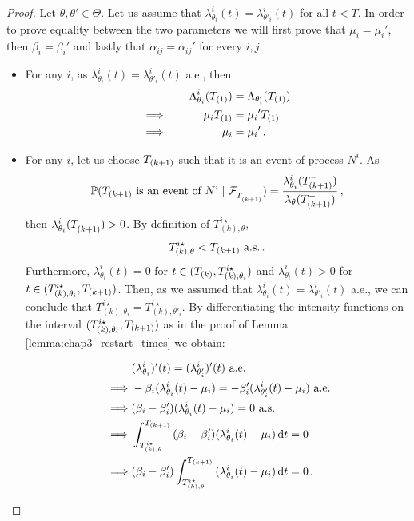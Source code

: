 \begin{subappendices}
\begin{proof}
      Let $\theta, \theta'\in \Theta$. Let us assume that $\lambda_{\theta_i}^i(t) = \lambda_{\theta'_i}^i(t)$ for all $t < T$. In order to prove equality between the two parameters we will first prove that $\mu_i = {\mu_i}'$, then $\beta_i = \beta_i'$ and lastly that $\alpha_{ij} = \alpha_{ij}'$ for every $i,j$. 
      
      \begin{itemize}
          \item For any $i$, as $\lambda_{\theta_i}^i(t) = \lambda_{\theta'_i}^i(t)$ a.e., then 
          \begin{alignat*}{2}
              &\quad& \Lambda_{\theta_i}^i(T\park[1]) &= \Lambda_{\theta'_i}(T\park[1])\\
              \implies && \mu_i T\park[1] &= {\mu_i}' T\park[1]\\
              \implies && \mu_i &= {\mu_i}'\,.
          \end{alignat*}
          
          \item For any $i$, let us choose $T\park[k+1]$ such that it is an event of process $N^i$. 
          As \[\PP(T\park[k+1] \text{ is an event of }N^i \mid \mathcal{F}_{T\park[k+1]^-}) = \frac{\lambda^i_{\theta_i}(T\park[k+1]^-)}{\lambda_{\theta}(T\park[k+1]^-)}\,,\]
          then $\lambda_{\theta_i}^i(T\park[k+1]^-) > 0$.
          By definition of $T_{(k),\theta}^{i\star}$, \[T_{(k),\theta}^{i\star} < T\park[k+1] \text{ a.s.} \,.\]
          Furthermore, $\lambda_{\theta_i}^i(t) = 0$ for $t\in(T\park, T_{(k), \theta_i}^{i\star})$ and $\lambda_{\theta_i}^i(t) > 0$ for $t\in(T_{(k), \theta_i}^{i\star}, T\park[k+1])$.
          Then, as we assumed that $\lambda_{\theta_i}^i(t) = \lambda_{\theta'_i}^i(t)$ a.e., we can conclude that $T_{(k), \theta_i}^{i\star} = T_{(k), \theta'_i}^{i\star}$. 
          By differentiating the intensity functions on the interval $(T_{(k),\theta_i}^{i\star}, T\park[k+1])$ as in the proof of Lemma \ref{lemma:chap3_restart_times} we obtain: 
          
          \begin{align*}
              \quad&(\lambda_{\theta_i}^i)'(t) = (\lambda_{\theta'_i}^i)'(t) \text{ a.e.}\\ 
              \implies &-\beta_i(\lambda_{\theta_i}^i(t) - \mu_i) =  -\beta_i'(\lambda_{\theta'_i}^i(t) - \mu_i) \text{ a.e.} \\
              \implies &(\beta_i - \beta_i')(\lambda_{\theta_i}^i(t) - \mu_i) = 0  \text{ a.s.}\\\
              \implies &\int_{T_{(k), \theta}^{i\star}}^{T\park[k+1]}{(\beta_i - \beta_i')(\lambda_{\theta_i}^i(t) - \mu_i)\,\mathrm{d}t} = 0\\
              \implies &(\beta_i - \beta_i')\int_{T_{(k), \theta}^{i\star}}^{T\park[k+1]}{(\lambda_{\theta_i}^i(t) - \mu_i)\,\mathrm{d}t} = 0\,.
          \end{align*}
          

\end{itemize}
\end{proof}
\end{subappendices}

